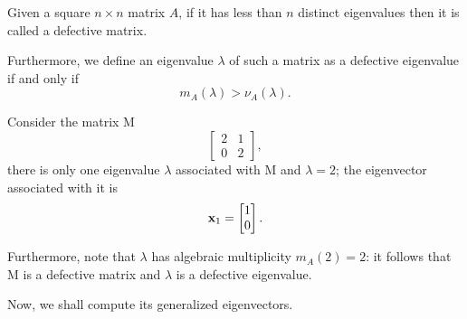 \begin{definition}
    Given a square \(n \times n\) matrix \(A\), if it has less than \(n\) distinct eigenvalues then it is called a
    defective matrix.

    Furthermore, we define an eigenvalue \(\lambda\) of such a matrix as a defective eigenvalue if and only if
    \[
        m_{A}(\lambda) > \nu_{A}(\lambda).
    \]
\end{definition}

\begin{example}
    Consider the matrix M
    \[
        \begin{bmatrix}
            2 & 1 \\
            0 & 2
        \end{bmatrix},
    \]
    there is only one eigenvalue \(\lambda\) associated with M and \(\lambda = 2\); the eigenvector associated with
    it is
    \[
        \vb{x}_{1} = \begin{bmatrix} 1 \\ 0 \end{bmatrix}.
    \]

    Furthermore, note that \(\lambda\) has algebraic multiplicity \(m_{A}(2) = 2\): it follows that M is a defective matrix
    and \(\lambda\) is a defective eigenvalue.

    Now, we shall compute its generalized eigenvectors.


\end{example}
